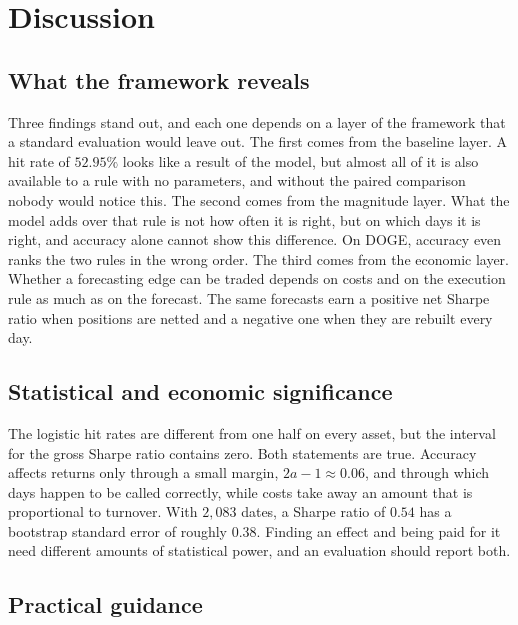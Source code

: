 \documentclass[preprint,12pt,authoryear,a4paper]{elsarticle}
\begin{document}
\section{Discussion}\label{sec:discussion}

\subsection{What the framework reveals}

Three findings stand out, and each one depends on a layer of the framework that a
standard evaluation would leave out. The first comes from the baseline layer. A hit
rate of $52.95\%$ looks like a result of the model, but almost all of it is also
available to a rule with no parameters, and without the paired comparison nobody
would notice this. The second comes from the magnitude layer. What the model adds
over that rule is not how often it is right, but on which days it is right, and
accuracy alone cannot show this difference. On DOGE, accuracy even ranks the two
rules in the wrong order. The third comes from the economic layer. Whether a
forecasting edge can be traded depends on costs and on the execution rule as much
as on the forecast. The same forecasts earn a positive net Sharpe ratio when
positions are netted and a negative one when they are rebuilt every day.

\subsection{Statistical and economic significance}

The logistic hit rates are different from one half on every asset, but the
interval for the gross Sharpe ratio contains zero. Both statements are true.
Accuracy affects returns only through a small margin, $2a-1\approx0.06$, and
through which days happen to be called correctly, while costs take away an amount
that is proportional to turnover. With $2{,}083$ dates, a Sharpe ratio of $0.54$
has a bootstrap standard error of roughly $0.38$. Finding an effect and being paid
for it need different amounts of statistical power, and an evaluation should report
both.

\subsection{Practical guidance}
\end{document}
